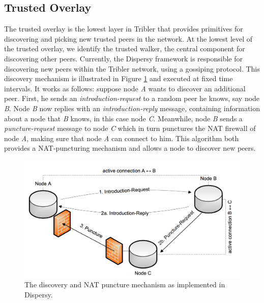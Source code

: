 \subsection{Trusted Overlay}
The trusted overlay is the lowest layer in Tribler that provides primitives for discovering and picking new trusted peers in the network. At the lowest level of the trusted overlay, we identify the trusted walker, the central component for discovering other peers. Currently, the Dispersy framework is responsible for discovering new peers within the Tribler network, using a gossiping protocol\cite{zeilemaker2013dispersy}. This discovery mechanism is illustrated in Figure \ref{fig:dispersy-discover} and executed at fixed time intervals. It works as follows: suppose node \emph{A} wants to discover an additional peer. First, he sends an \emph{introduction-request} to a random peer he knows, say node \emph{B}. Node \emph{B} now replies with an \emph{introduction-reply} message, containing information about a node that \emph{B} knows, in this case node \emph{C}. Meanwhile, node \emph{B} sends a \emph{puncture-request} message to node \emph{C} which in turn punctures the NAT firewall of node \emph{A}, making sure that node \emph{A} can connect to him. This algorithm both provides a NAT-puncturing mechanism and allows a node to discover new peers.\\

\begin{figure}[h!]
	\centering
	\includegraphics[width=0.7\columnwidth]{images/architecture/dispersy_discover}
	\caption{The discovery and NAT puncture mechanism as implemented in Dispersy.}
	\label{fig:dispersy-discover}
\end{figure}

